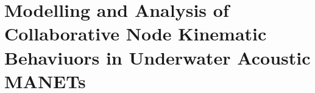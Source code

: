 

\chapter{Modelling and Analysis of Collaborative Node Kinematic Behaviuors in Underwater Acoustic MANETs} %
\label{Chapter\thechapter}


